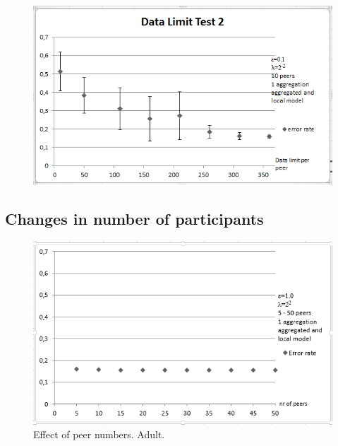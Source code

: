 \begin{figure}[H]
	\begin{minipage}{.65\linewidth}
		\includegraphics[width=\linewidth]{fig/spambase/data_limit_test_withlocalmodel}
		\label{fig:data_limit_test_withlocalmodel}
	\end{minipage}
\end{figure}


\subsection{Changes in number of participants}
\begin{figure}[H]
	\centering
	\includegraphics[width=\textwidth]{fig/adult/peer_range_constant_group}
	\caption{Effect of peer numbers. Adult.}
	\label{fig:peer_range_constant_group}
\end{figure}


